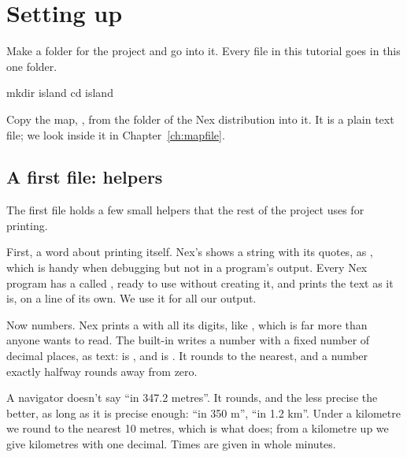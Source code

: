 \chapter{Setting up}\label{ch:setup}

Make a folder for the project and go into it. Every file in this tutorial
goes in this one folder.

\begin{shell}
mkdir island
cd island
\end{shell}

Copy the map, , from the 
folder of the Nex distribution into it. It is a plain text file; we look
inside it in Chapter~\ref{ch:mapfile}.

\section{A first file: helpers}

The first file holds a few small helpers that the rest of the project uses
for printing.

First, a word about printing itself. Nex's  shows a string
with its quotes, as , which is handy when debugging but not
in a program's output. Every Nex program has a  called
, ready to use without creating it, and
 prints the text as it is, on a line of
its own. We use it for all our output.

Now numbers. Nex prints a  with all its digits, like
, which is far more than anyone wants to read. The
built-in  writes a number with a fixed number of decimal
places, as text:  is , and
 is . It rounds to the nearest,
and a number exactly halfway rounds away from zero.

A navigator doesn't say ``in 347.2 metres''. It rounds, and the less
precise the better, as long as it is precise enough: ``in 350 m'',
``in 1.2 km''. Under a kilometre we round to the nearest 10 metres, which
is what  does; from a kilometre up we
give kilometres with one decimal. Times are given in whole minutes.

